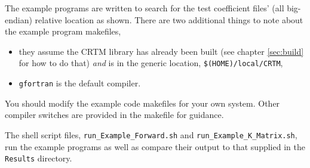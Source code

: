 The example programs are written to search for the test coefficient files' (all big-endian) relative location as shown. There are two additional things to note about the example program makefiles,
\begin{itemize}
  \item they assume the CRTM library has already been built (see chapter \ref{sec:build} for how to do that) \emph{and} is in the generic location, \texttt{\$(HOME)/local/CRTM},
  \item \texttt{gfortran} is the default compiler.
\end{itemize}
You should modify the example code makefiles for your own system. Other compiler switches are provided in the makefile for guidance. 

The shell script files, \texttt{run\_Example\_Forward.sh} and \texttt{run\_Example\_K\_Matrix.sh}, run the example programs as well as compare their output to that supplied in the \texttt{Results} directory.




